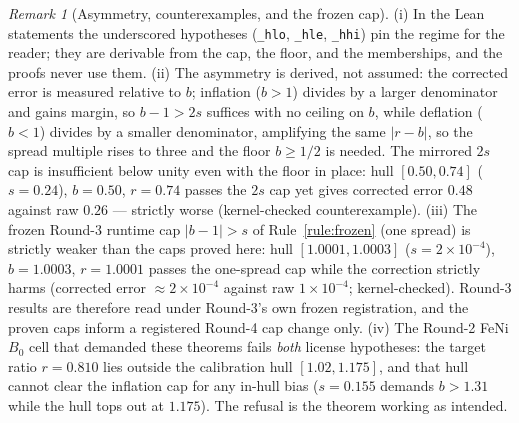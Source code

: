 \documentclass[11pt]{article}
\theoremstyle{definition}
\theoremstyle{remark}
\newtheorem{remark}{Remark}
\newcommand{\code}[1]{\texttt{#1}}
\begin{document}
\begin{remark}[Asymmetry, counterexamples, and the frozen cap]\label{rem:asymmetry}
(i) In the Lean statements the underscored hypotheses (\code{\_hlo}, \code{\_hle}, \code{\_hhi}) pin the regime for the reader; they are derivable from the cap, the floor, and the memberships, and the proofs never use them. (ii) The asymmetry is derived, not assumed: the corrected error is measured relative to $b$; inflation ($b > 1$) divides by a larger denominator and gains margin, so $b - 1 > 2s$ suffices with no ceiling on $b$, while deflation ($b < 1$) divides by a smaller denominator, amplifying the same $|r - b|$, so the spread multiple rises to three and the floor $b \ge 1/2$ is needed. The mirrored $2s$ cap is insufficient below unity even with the floor in place: hull $[0.50, 0.74]$ ($s = 0.24$), $b = 0.50$, $r = 0.74$ passes the $2s$ cap yet gives corrected error $0.48$ against raw $0.26$ --- strictly worse (kernel-checked counterexample). (iii) The frozen Round-3 runtime cap $|b - 1| > s$ of Rule~\ref{rule:frozen} (one spread) is strictly weaker than the caps proved here: hull $[1.0001, 1.0003]$ ($s = 2\times10^{-4}$), $b = 1.0003$, $r = 1.0001$ passes the one-spread cap while the correction strictly harms (corrected error $\approx 2\times10^{-4}$ against raw $1\times10^{-4}$; kernel-checked). Round-3 results are therefore read under Round-3's own frozen registration, and the proven caps inform a registered Round-4 cap change only. (iv) The Round-2 FeNi $B_0$ cell that demanded these theorems fails \emph{both} license hypotheses: the target ratio $r = 0.810$ lies outside the calibration hull $[1.02, 1.175]$, and that hull cannot clear the inflation cap for any in-hull bias ($s = 0.155$ demands $b > 1.31$ while the hull tops out at $1.175$). The refusal is the theorem working as intended.
\end{remark}
\end{document}
